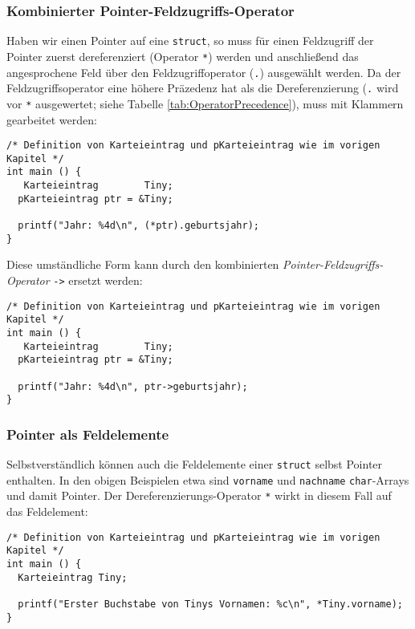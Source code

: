 \subsubsection{Kombinierter Pointer-Feldzugriffs-Operator}
Haben wir einen Pointer auf eine \texttt{struct}, so muss für einen Feldzugriff der Pointer zuerst dereferenziert (Operator \texttt{*}) werden und anschließend das angesprochene Feld über den Feldzugriffoperator (\texttt{.}) ausgewählt werden. Da der Feldzugriffsoperator eine höhere Präzedenz hat als die Dereferenzierung (\ie \texttt{.} wird vor \texttt{*} ausgewertet; siehe Tabelle \ref{tab:OperatorPrecedence}), muss mit Klammern gearbeitet werden:

\begin{codebox}
\begin{verbatim}
/* Definition von Karteieintrag und pKarteieintrag wie im vorigen Kapitel */
int main () {
   Karteieintrag        Tiny;
  pKarteieintrag ptr = &Tiny;

  printf("Jahr: %4d\n", (*ptr).geburtsjahr);
}
\end{verbatim}
\end{codebox}

Diese umständliche Form kann durch den kombinierten \emph{Pointer-Feldzugriffs-Operator} \texttt{->} ersetzt werden:

\begin{codebox}
\begin{verbatim}
/* Definition von Karteieintrag und pKarteieintrag wie im vorigen Kapitel */
int main () {
   Karteieintrag        Tiny;
  pKarteieintrag ptr = &Tiny;

  printf("Jahr: %4d\n", ptr->geburtsjahr);
}
\end{verbatim}
\end{codebox}

\subsubsection{Pointer als Feldelemente}
Selbstverständlich können auch die Feldelemente einer \texttt{struct} selbst Pointer enthalten. In den obigen Beispielen etwa sind \texttt{vorname} und \texttt{nachname} \texttt{char}-Arrays und damit Pointer. Der Dereferenzierungs-Operator \texttt{*} wirkt in diesem Fall auf das Feldelement:
\begin{codebox}
\begin{verbatim}
/* Definition von Karteieintrag und pKarteieintrag wie im vorigen Kapitel */
int main () {
  Karteieintrag Tiny;

  printf("Erster Buchstabe von Tinys Vornamen: %c\n", *Tiny.vorname);
}
\end{verbatim}
\end{codebox}

